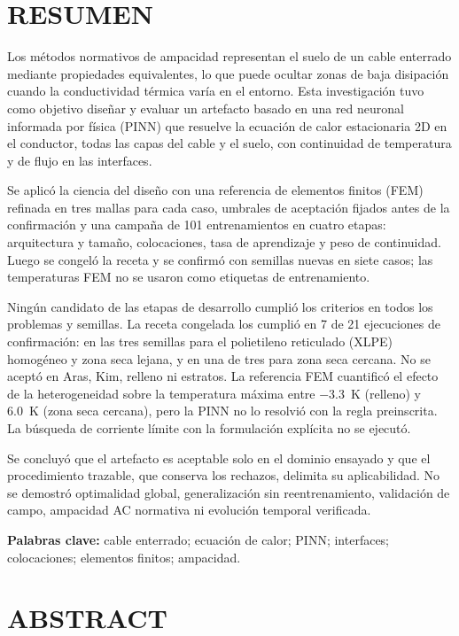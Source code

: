 ﻿\chapter*{RESUMEN}

Los métodos normativos de ampacidad representan el suelo de un cable enterrado mediante propiedades equivalentes, lo que puede ocultar zonas de baja disipación cuando la conductividad térmica varía en el entorno. Esta investigación tuvo como objetivo diseñar y evaluar un artefacto basado en una red neuronal informada por física (PINN) que resuelve la ecuación de calor estacionaria 2D en el conductor, todas las capas del cable y el suelo, con continuidad de temperatura y de flujo en las interfaces.

Se aplicó la ciencia del diseño con una referencia de elementos finitos (FEM) refinada en tres mallas para cada caso, umbrales de aceptación fijados antes de la confirmación y una campaña de 101 entrenamientos en cuatro etapas: arquitectura y tamaño, colocaciones, tasa de aprendizaje y peso de continuidad. Luego se congeló la receta y se confirmó con semillas nuevas en siete casos; las temperaturas FEM no se usaron como etiquetas de entrenamiento.

Ningún candidato de las etapas de desarrollo cumplió los criterios en todos los problemas y semillas. La receta congelada los cumplió en 7 de 21 ejecuciones de confirmación: en las tres semillas para el polietileno reticulado (XLPE) homogéneo y zona seca lejana, y en una de tres para zona seca cercana. No se aceptó en Aras, Kim, relleno ni estratos. La referencia FEM cuantificó el efecto de la heterogeneidad sobre la temperatura máxima entre \SI{-3,3}{\kelvin} (relleno) y \SI{+6,0}{\kelvin} (zona seca cercana), pero la PINN no lo resolvió con la regla preinscrita. La búsqueda de corriente límite con la formulación explícita no se ejecutó.

Se concluyó que el artefacto es aceptable solo en el dominio ensayado y que el procedimiento trazable, que conserva los rechazos, delimita su aplicabilidad. No se demostró optimalidad global, generalización sin reentrenamiento, validación de campo, ampacidad AC normativa ni evolución temporal verificada.

\noindent\textbf{Palabras clave:} cable enterrado; ecuación de calor; PINN; interfaces; colocaciones; elementos finitos; ampacidad.

\chapter*{ABSTRACT}

